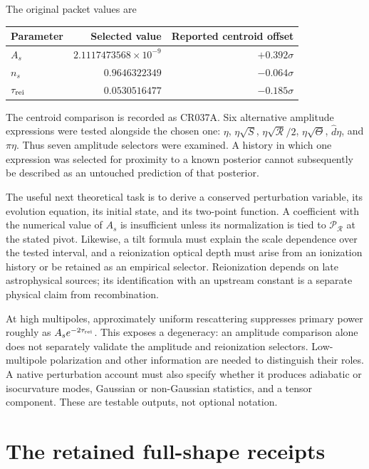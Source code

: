 The original packet values are
\begin{center}
\small\setlength{\tabcolsep}{3pt}
\begin{tabular}{@{}lrr@{}}
\toprule
Parameter & Selected value & Reported centroid offset\\
\midrule
$A_s$ &$2.1117473568\times10^{-9}$&$+0.392\sigma$\\
$n_s$ &$0.9646322349$&$-0.064\sigma$\\
$\tau_{\rm rei}$ &$0.0530516477$&$-0.185\sigma$\\
\bottomrule
\end{tabular}
\end{center}
The centroid comparison is recorded as CR037A. Six alternative amplitude expressions were tested alongside the chosen one: $\eta$, $\eta\sqrt S$, $\eta\sqrt{\mathcal R}/2$, $\eta\sqrt\Theta$, $\widehat d\eta$, and $\pi\eta$. Thus seven amplitude selectors were examined. A history in which one expression was selected for proximity to a known posterior cannot subsequently be described as an untouched prediction of that posterior.

The useful next theoretical task is to derive a conserved perturbation variable, its evolution equation, its initial state, and its two-point function. A coefficient with the numerical value of $A_s$ is insufficient unless its normalization is tied to $\mathcal P_{\mathcal R}$ at the stated pivot. Likewise, a tilt formula must explain the scale dependence over the tested interval, and a reionization optical depth must arise from an ionization history or be retained as an empirical selector. Reionization depends on late astrophysical sources; its identification with an upstream constant is a separate physical claim from recombination.

At high multipoles, approximately uniform rescattering suppresses primary power roughly as $A_se^{-2\tau_{\rm rei}}$. This exposes a degeneracy: an amplitude comparison alone does not separately validate the amplitude and reionization selectors. Low-multipole polarization and other information are needed to distinguish their roles. A native perturbation account must also specify whether it produces adiabatic or isocurvature modes, Gaussian or non-Gaussian statistics, and a tensor component. These are testable outputs, not optional notation.

\section{The retained full-shape receipts}

